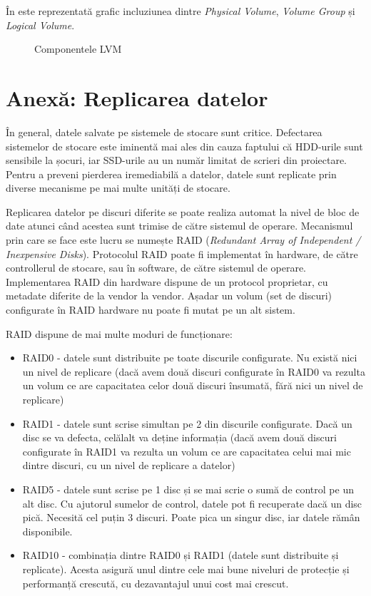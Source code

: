 În  este reprezentată grafic incluziunea dintre \textit{Physical Volume}, \textit{Volume Group} și \textit{Logical Volume}.

\begin{figure}[htbp]
  \centering
  \def\svgwidth{\columnwidth}
  
  \caption{Componentele LVM}
  \label{fig:storage:lvm}
\end{figure}

\section{Anexă: Replicarea datelor}
\label{sec:storage:raid}

În general, datele salvate pe sistemele de stocare sunt critice.
Defectarea sistemelor de stocare este iminentă mai ales din cauza faptului că HDD-urile sunt sensibile la șocuri, iar SSD-urile au un număr limitat de scrieri din proiectare.
Pentru a preveni pierderea iremediabilă a datelor, datele sunt replicate prin diverse mecanisme pe mai multe unități de stocare.

Replicarea datelor pe discuri diferite se poate realiza automat la nivel de bloc de date atunci când acestea sunt trimise de către sistemul de operare.
 Mecanismul prin care se face este lucru se numește RAID  (\textit{Redundant Array of Independent / Inexpensive Disks}).
Protocolul RAID poate fi implementat în hardware, de către controllerul de stocare, sau în software, de către sistemul de operare.
 Implementarea RAID din hardware dispune de un protocol proprietar, cu metadate diferite de la vendor la vendor.
Așadar un volum (set de discuri) configurate în RAID hardware nu poate fi mutat pe un alt sistem.

RAID dispune de mai multe moduri de funcționare:

\begin{itemize}
  \item RAID0 - datele sunt distribuite pe toate discurile configurate.
    Nu există nici un nivel de replicare (dacă avem două discuri configurate în RAID0 va rezulta un volum ce are capacitatea celor două discuri însumată, fără nici un nivel de replicare)
  \item RAID1 - datele sunt scrise simultan pe 2 din discurile configurate.
    Dacă un disc se va defecta, celălalt va deține informația (dacă avem două discuri configurate în RAID1 va rezulta un volum ce are capacitatea celui mai mic dintre discuri, cu un nivel de replicare a datelor)
  \item RAID5 - datele sunt scrise pe 1 disc și se mai scrie o sumă de control pe un alt disc.
    Cu ajutorul sumelor de control, datele pot fi recuperate dacă un disc pică.
    Necesită cel puțin 3 discuri.
    Poate pica un singur disc, iar datele rămân disponibile.
  \item RAID10 - combinația dintre RAID0 și RAID1 (datele sunt distribuite și replicate).
    Acesta asigură unul dintre cele mai bune niveluri de protecție și performanță crescută, cu dezavantajul unui cost mai crescut.
\end{itemize}


